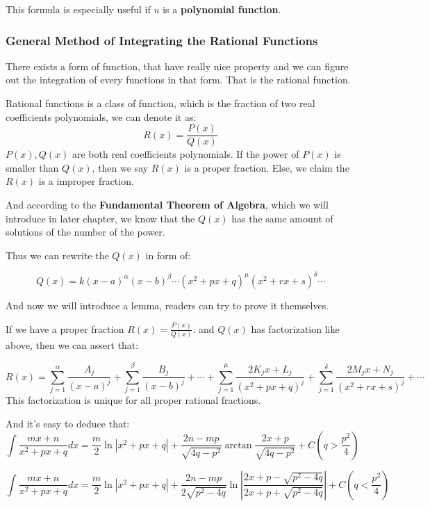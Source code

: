 This formula is especially useful if $u$ is a \textbf{polynomial function}.

\subsubsection{General Method of Integrating the Rational Functions}

There exists a form of function, that have really nice property and we can figure out the integration of every functions in that form. That is the rational function.

\begin{definition}
Rational functions is a class of function, which is the fraction of two real coefficients polynomials, we can denote it as:
\[
R(x) = \frac{P(x)}{Q(x)}
\]
$P(x),Q(x)$ are both real coefficients polynomials. If the power of $P(x)$ is smaller than $Q(x)$, then we say $R(x)$ is a proper fraction. Else, we claim the $R(x)$ is a improper fraction.
\end{definition}

And according to the \textbf{Fundamental Theorem of Algebra}, which we will introduce in later chapter, we know that the $Q(x)$ has the same amount of solutions of the number of the power.

Thus we can rewrite the $Q(x)$ in form of:

\[
Q(x) = k (x-a)^{\alpha} (x-b)^{\beta} \cdots (x^2 + px + q)^{\mu} (x^2 + rx + s)^{\delta} \cdots
\]

And now we will introduce a lemma, readers can try to prove it themselves.

\begin{lemma}
If we have a proper fraction $R(x) = \frac{P(x)}{Q(x)}$. and $Q(x)$ has factorization like above, then we can assert that:

\[
R(x) = \sum_{j=1}^{\alpha} \frac{A_j}{(x-a)^j} + \sum_{j=1}^{\beta} \frac{B_j}{(x-b)^j} + \cdots + \sum_{j=1}^{\mu} \frac{2K_jx + L_j}{(x^2 + px +q)^j} + \sum_{j=1}^{\delta} \frac{2M_jx + N_j}{(x^2 + rx +s)^j} + \cdots
\]
This factorization is unique for all proper rational fractions.
\end{lemma}

And it's easy to deduce that:
\[
\int \frac{mx+n}{x^2 + px + q} dx = \frac{m}{2} \ln |x^2 + px + q| + \frac{2n-mp}{\sqrt{4q - p^2}} \arctan \frac{2x + p}{\sqrt{4q - p^2}} + C (q > \frac{p^2}{4})
\]

\[
\int \frac{mx+n}{x^2 + px + q} dx = \frac{m}{2} \ln |x^2 + px + q| + \frac{2n-mp}{2\sqrt{p^2 - 4q}} \ln \left| \frac{2x + p - \sqrt{p^2 - 4q}}{2x + p + \sqrt{p^2 - 4q}} \right| + C (q < \frac{p^2}{4})
\]

